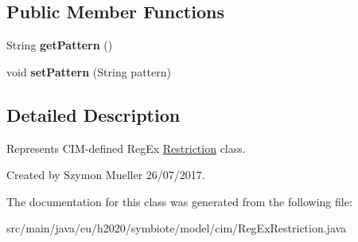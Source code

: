 \subsection*{Public Member Functions}
\begin{DoxyCompactItemize}
\item 
\mbox{\label{classeu_1_1h2020_1_1symbiote_1_1model_1_1cim_1_1RegExRestriction_ab362e66679d055c5bb4319b62d967c8e}} 
String {\bfseries get\+Pattern} ()
\item 
\mbox{\label{classeu_1_1h2020_1_1symbiote_1_1model_1_1cim_1_1RegExRestriction_a6d4159535d333e735784f1506d343296}} 
void {\bfseries set\+Pattern} (String pattern)
\end{DoxyCompactItemize}


\subsection{Detailed Description}
Represents C\+I\+M-\/defined Reg\+Ex \hyperlink{classeu_1_1h2020_1_1symbiote_1_1model_1_1cim_1_1Restriction}{Restriction} class.

Created by Szymon Mueller 26/07/2017. 

The documentation for this class was generated from the following file\+:\begin{DoxyCompactItemize}
\item 
src/main/java/eu/h2020/symbiote/model/cim/Reg\+Ex\+Restriction.\+java\end{DoxyCompactItemize}
